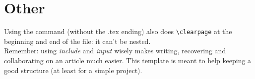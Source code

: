 \section{Other}
Using the command \verb== (without the .tex ending)
also does \verb=\clearpage= at the beginning and end of the file: it
can't be nested.\\

Remember: using \emph{include} and \emph{input} wisely makes writing,
recovering and collaborating on an article much easier. This template
is meant to help keeping a good structure (at least for a simple project).
